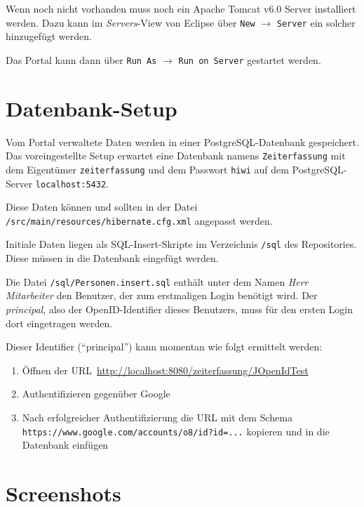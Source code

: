 \documentclass[article,colorback,accentcolor=tud2c]{tudreport}
\begin{document}
Wenn noch nicht vorhanden muss noch ein Apache Tomcat v6.0 Server installiert werden. Dazu kann im \emph{Servers}-View von Eclipse über \texttt{New} $\rightarrow$ \texttt{Server} ein solcher hinzugefügt werden.

Das Portal kann dann über \texttt{Run As} $\rightarrow$ \texttt{Run on Server} gestartet werden.


\section{Datenbank-Setup} %
\label{sec:datenbank_setup}

Vom Portal verwaltete Daten werden in einer PostgreSQL-Datenbank gespeichert. Das voreingestellte Setup erwartet eine Datenbank namens \texttt{Zeiterfassung} mit dem Eigentümer \texttt{zeiterfassung} und dem Passwort \texttt{hiwi} auf dem PostgreSQL-Server \texttt{localhost:5432}.

Diese Daten können und sollten in der Datei \texttt{/src/main/resources/hibernate.cfg.xml} angepasst werden.

Initiale Daten liegen als SQL-Insert-Skripte im Verzeichnis \texttt{/sql} des Repositories. Diese müssen in die Datenbank eingefügt werden.

Die Datei \texttt{/sql/Personen.insert.sql} enthält unter dem Namen \emph{Herr Mitarbeiter} den Benutzer, der zum erstmaligen Login benötigt wird. Der \emph{principal}, also der OpenID-Identifier dieses Benutzers, muss für den ersten Login dort eingetragen werden.

Dieser Identifier (``principal'') kann momentan wie folgt ermittelt werden:

\begin{enumerate}
    \item Öffnen der URL~\url{http://localhost:8080/zeiterfassung/JOpenIdTest}
    \item Authentifizieren gegenüber Google
    \item Nach erfolgreicher Authentifizierung die URL mit dem Schema \texttt{https://www.google.com/accounts/o8/id?id=...} kopieren und in die Datenbank einfügen
\end{enumerate}


\section{Screenshots} %
\label{sec:screenshots}
\end{document}

